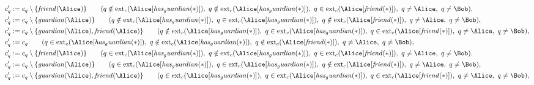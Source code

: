 \begin{align*}
&
c'_
q
 := 
c_
q
 \setminus 
\{
\mathit{
friend
}
(
\Alice
)
\}
 \qquad (
q
 \notin 
\mathrm{ext}_c(
\Alice
[
\mathit{
has_guardian
}
(
\ast
)
]
)
,\ 
q
 \notin 
\mathrm{ext}_c(
\Alice
[
\mathit{
has_guardian
}
(
\ast
)
]
)
,\ 
q
 \in 
\mathrm{ext}_c(
\Alice
[
\mathit{
friend
}
(
\ast
)
]
)
,\ 
q \neq 
\Alice
,\ 
q \neq 
\Bob
)
,\\
&
c'_
q
 := 
c_
q
 \setminus 
\{
\mathit{
guardian
}
(
\Alice
)
\}
 \qquad (
q
 \notin 
\mathrm{ext}_c(
\Alice
[
\mathit{
has_guardian
}
(
\ast
)
]
)
,\ 
q
 \in 
\mathrm{ext}_c(
\Alice
[
\mathit{
has_guardian
}
(
\ast
)
]
)
,\ 
q
 \notin 
\mathrm{ext}_c(
\Alice
[
\mathit{
friend
}
(
\ast
)
]
)
,\ 
q \neq 
\Alice
,\ 
q \neq 
\Bob
)
,\\
&
c'_
q
 := 
c_
q
 \setminus 
\{
\mathit{
guardian
}
(
\Alice
)
,
\mathit{
friend
}
(
\Alice
)
\}
 \qquad (
q
 \notin 
\mathrm{ext}_c(
\Alice
[
\mathit{
has_guardian
}
(
\ast
)
]
)
,\ 
q
 \in 
\mathrm{ext}_c(
\Alice
[
\mathit{
has_guardian
}
(
\ast
)
]
)
,\ 
q
 \in 
\mathrm{ext}_c(
\Alice
[
\mathit{
friend
}
(
\ast
)
]
)
,\ 
q \neq 
\Alice
,\ 
q \neq 
\Bob
)
,\\
&
c'_
q
 := 
c_
q
 \qquad (
q
 \in 
\mathrm{ext}_c(
\Alice
[
\mathit{
has_guardian
}
(
\ast
)
]
)
,\ 
q
 \notin 
\mathrm{ext}_c(
\Alice
[
\mathit{
has_guardian
}
(
\ast
)
]
)
,\ 
q
 \notin 
\mathrm{ext}_c(
\Alice
[
\mathit{
friend
}
(
\ast
)
]
)
,\ 
q \neq 
\Alice
,\ 
q \neq 
\Bob
)
,\\
&
c'_
q
 := 
c_
q
 \setminus 
\{
\mathit{
friend
}
(
\Alice
)
\}
 \qquad (
q
 \in 
\mathrm{ext}_c(
\Alice
[
\mathit{
has_guardian
}
(
\ast
)
]
)
,\ 
q
 \notin 
\mathrm{ext}_c(
\Alice
[
\mathit{
has_guardian
}
(
\ast
)
]
)
,\ 
q
 \in 
\mathrm{ext}_c(
\Alice
[
\mathit{
friend
}
(
\ast
)
]
)
,\ 
q \neq 
\Alice
,\ 
q \neq 
\Bob
)
,\\
&
c'_
q
 := 
c_
q
 \setminus 
\{
\mathit{
guardian
}
(
\Alice
)
\}
 \qquad (
q
 \in 
\mathrm{ext}_c(
\Alice
[
\mathit{
has_guardian
}
(
\ast
)
]
)
,\ 
q
 \in 
\mathrm{ext}_c(
\Alice
[
\mathit{
has_guardian
}
(
\ast
)
]
)
,\ 
q
 \notin 
\mathrm{ext}_c(
\Alice
[
\mathit{
friend
}
(
\ast
)
]
)
,\ 
q \neq 
\Alice
,\ 
q \neq 
\Bob
)
,\\
&
c'_
q
 := 
c_
q
 \setminus 
\{
\mathit{
guardian
}
(
\Alice
)
,
\mathit{
friend
}
(
\Alice
)
\}
 \qquad (
q
 \in 
\mathrm{ext}_c(
\Alice
[
\mathit{
has_guardian
}
(
\ast
)
]
)
,\ 
q
 \in 
\mathrm{ext}_c(
\Alice
[
\mathit{
has_guardian
}
(
\ast
)
]
)
,\ 
q
 \in 
\mathrm{ext}_c(
\Alice
[
\mathit{
friend
}
(
\ast
)
]
)
,\ 
q \neq 
\Alice
,\ 
q \neq 
\Bob
)
,\\

\end{align*}
